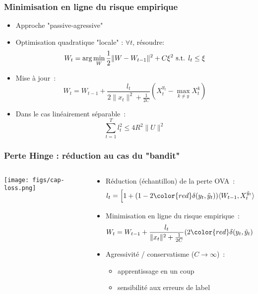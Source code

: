 \documentclass{beamer}
\begin{document}
\begin{frame}\frametitle{Minimisation en ligne du risque empirique}
	\begin{itemize}
		\item Approche "passive-agressive" \cite{crammer2006online}
		\item Optimisation quadratique "locale" : $\forall t$, résoudre: 
		$$W_{t} = \arg \min_W \frac{1}{2} \| W - W_{t-1}\|^2 + C \xi^2 \hbox{ s.t. } l_t \leq \xi$$
		\item Mise à jour~:
		$$W_{t} =  W_{t-1} + \frac{l_t}{2\|x_t\|^2 + \frac{1}{2C}}  (X_t^{y_t} - \max_{k \neq y} X_t^k)$$
		\item Dans le cas linéairement séparable~:
		$$\sum_{t=1}^{T} l_t^2 \leqslant 4 R^2 \parallel{U}\parallel^2$$
	\end{itemize}
\end{frame}


\begin{frame}\frametitle{Perte Hinge : réduction au cas du "bandit"}
	\begin{columns}
		\begin{column}{.2 \linewidth}
			\centerline{\texttt{[image: figs/cap-loss.png]}}
		\end{column}
		\begin{column}{.8 \linewidth}
			\begin{itemize}
				\item Réduction (échantillon) de la perte OVA~: 
				$$l_t =  \left[1 + (1 - 2 {\color{red}\delta(y_t,\tilde{y}_t)}) \langle W_{t-1}, X_t^{\tilde{y}_t}\rangle\right]_+$$

				\item Minimisation en ligne du risque empirique~:
				$$W_{t} =  W_{t-1} + \frac{l_t}{\|x_t\|^2 + \frac{1}{2C}}  (2 {\color{red}\delta(y_t,\tilde{y}_t)} - 1) X_t^{\tilde{y}_t}$$		
				\item Agressivité / conservatisme ($C \rightarrow \infty$)~:
				\begin{itemize}
					\item apprentissage en un coup
					\item sensibilité aux erreurs de label
				\end{itemize}	
			\end{itemize}
		\end{column}
	\end{columns}
\end{frame}
\end{document}
